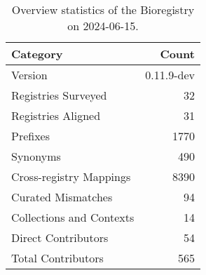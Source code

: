 \begin{table}
\caption{Overview statistics of the Bioregistry on 2024-06-15.}
\label{tab:bioregistry-summary}
\begin{tabular}{lr}
\toprule
Category & Count \\
\midrule
Version & 0.11.9-dev \\
Registries Surveyed & 32 \\
Registries Aligned & 31 \\
Prefixes & 1770 \\
Synonyms & 490 \\
Cross-registry Mappings & 8390 \\
Curated Mismatches & 94 \\
Collections and Contexts & 14 \\
Direct Contributors & 54 \\
Total Contributors & 565 \\
\bottomrule
\end{tabular}
\end{table}
